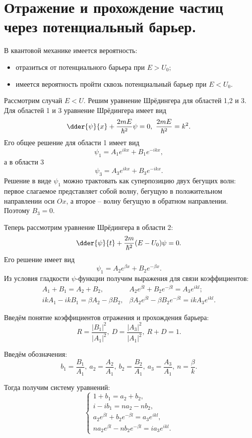 \chapter{Отражение и прохождение частиц через потенциальный барьер.}
В квантовой механике имеется вероятность:
\begin{itemize}
    \item отразиться от потенциального барьера при \( E > U_0 \);
    \item имеется вероятность пройти сквозь потенциальный барьер при
    \( E < U_0 \).
\end{itemize}

Рассмотрим случай \( E < U \). Решим уравнение Шрёдингера для областей 1,2 и 3.
Для областей 1 и 3 уравнение Шрёдингера имеет вид
\[
    \dder{\psi}{x} + \frac{2mE}{\hbar^2}\psi = 0,\ \frac{2mE}{\hbar^2} = k^2.
\] 
Его общее решение для области 1 имеет вид
\[
    \psi_1 = A_1 e^{ikx} + B_1 e^{-ikx},
\]
а в области 3
\[
    \psi_3 = A_3 e^{ikx} + B_3 e^{-ikx}.
\]
Решение в виде \( \psi_1 \) можно трактовать как суперпозицию двух бегущих волн:
первое слагаемое представляет собой волну, бегущую в положительном направлении
оси \( Ox \), а второе -- волну бегущую в обратном направлении. Поэтому
\( B_3 = 0 \).

Теперь рассмотрим уравнение Шрёдингера в области 2:
\[
    \dder{\psi}{t} + \frac{2m}{\hbar^2}(E - U_0)\psi = 0.
\]
Его решение имеет вид
\[
    \psi_1 = A_2 e^{\beta x} + B_2 e^{-\beta x}.
\]
Из условия гладкости \( \psi \)-функции получим выражения для связи коэффициентов:
\begin{align*}
    A_1 + B_1 = A_2 + B_2, & A_2 e^{\beta l} + B_2 e^{-\beta l} = A_3 e^{ikl};\\
    ik A_1 - ik B_1 = \beta A_2 - \beta B_2, & \beta A_2 e^{\beta l} - \beta
    B_2 e^{-\beta l} = ik A_3 e^{ikl}. 
\end{align*}

Введём понятие коэффициентов отражения и прохождения барьера:
\[
    R = \frac{|B_1|^2}{|A_1|^2},\ 
    D = \frac{|A_3|^2}{|A_1|^2},\ 
    R + D = 1.
\]

Введём обозначения:
\[
    b_1 = \frac{B_1}{A_1},\ a_2 = \frac{A_2}{A_1},\ b_2 = \frac{B_2}{A_1},\ 
    a_3 = \frac{A_3}{A_1},\ n = \frac{\beta}{k}.
\]

Тогда получим систему уравнений:
\[
    \left\{
    \begin{array}{l}
        1 + b_1 = a_2 + b_2, \\
        i - ib_1 = n a_2 - n b_2, \\
        a_2 e^{\beta l} + b_2 e^{-\beta l} = a_3 e^{ikl}, \\
        na_2 e^{\beta l} - nb_2e^{-\beta l} = ia_3 e^{ikl}.
    \end{array}
    \right.
\]

